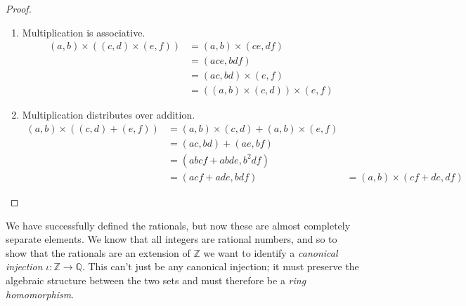 \begin{proof}
\begin{enumerate}
        \item Multiplication is associative. 
        \begin{align}
          (a, b) \times ((c, d) \times (e, f)) & = (a, b) \times (ce, df) \\ 
                                               & = (ace, bdf) \\
                                               & = (ac, bd) \times (e, f) \\
                                               & = ((a, b) \times (c, d)) \times (e, f)
        \end{align}
        \item Multiplication distributes over addition. 
          \begin{align}
            (a, b) \times ((c, d) + (e, f)) & = (a, b) \times (c, d) + (a, b) \times (e, f) \\
                                            & = (ac, bd) + (ae, bf) \\
                                            & = (abcf + abde, b^2 df) \\
                                            & = (acf + ade, bdf)  
                                            & = (a, b) \times (cf + de, df)
          \end{align}
      \end{enumerate}
    \end{proof} 

    We have successfully defined the rationals, but now these are almost completely separate elements. We know that all integers are rational numbers, and so to show that the rationals are an extension of $\mathbb{Z}$ we want to identify a \textit{canonical injection} $\iota: \mathbb{Z} \rightarrow \mathbb{Q}$. This can't just be any canonical injection; it must preserve the algebraic structure between the two sets and must therefore be a \textit{ring homomorphism}. 

